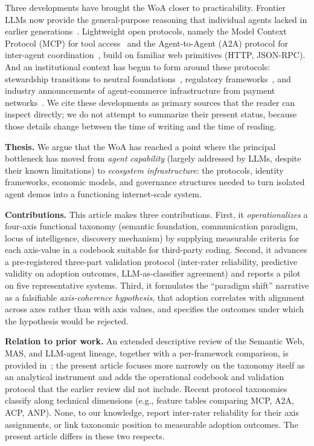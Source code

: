 \documentclass[10pt,twocolumn]{article}
\begin{document}
Three developments have brought the WoA closer to practicability.  Frontier LLMs now provide the general-purpose reasoning that individual agents lacked in earlier generations~\cite{Brown_2020}.  Lightweight open protocols, namely the Model Context Protocol (MCP) for tool access~\cite{MCP_2025} and the Agent-to-Agent (A2A) protocol for inter-agent coordination~\cite{Google_2025_A2A}, build on familiar web primitives (HTTP, JSON-RPC).  And an institutional context has begun to form around these protocols: stewardship transitions to neutral foundations~\cite{AAIF_2025, A2A_LinuxFoundation_2025}, regulatory frameworks~\cite{EUAI_2024}, and industry announcements of agent-commerce infrastructure from payment networks~\cite{Visa_TAP_2025, Mastercard_AgentPay_2025, Stripe_OpenAI_ACP_2025}.  We cite these developments as primary sources that the reader can inspect directly; we do not attempt to summarize their present status, because those details change between the time of writing and the time of reading.

\textbf{Thesis.}  We argue that the WoA has reached a point where the principal bottleneck has moved from \emph{agent capability} (largely addressed by LLMs, despite their known limitations) to \emph{ecosystem infrastructure}: the protocols, identity frameworks, economic models, and governance structures needed to turn isolated agent demos into a functioning internet-scale system.

\textbf{Contributions.}  This article makes three contributions.  First, it \emph{operationalizes} a four-axis functional taxonomy (semantic foundation, communication paradigm, locus of intelligence, discovery mechanism) by supplying measurable criteria for each axis-value in a codebook suitable for third-party coding.  Second, it advances a pre-registered three-part validation protocol (inter-rater reliability, predictive validity on adoption outcomes, LLM-as-classifier agreement) and reports a pilot on five representative systems.  Third, it formulates the ``paradigm shift'' narrative as a falsifiable \emph{axis-coherence hypothesis}, that adoption correlates with alignment across axes rather than with axis values, and specifies the outcomes under which the hypothesis would be rejected.

\textbf{Relation to prior work.}  An extended descriptive review of the Semantic Web, MAS, and LLM-agent lineage, together with a per-framework comparison, is provided in~\cite{Petrova_WoA_Survey_2025}; the present article focuses more narrowly on the taxonomy itself as an analytical instrument and adds the operational codebook and validation protocol that the earlier review did not include.  Recent protocol taxonomies classify along technical dimensions (e.g., feature tables comparing MCP, A2A, ACP, ANP).  None, to our knowledge, report inter-rater reliability for their axis assignments, or link taxonomic position to measurable adoption outcomes.  The present article differs in these two respects.
\end{document}
